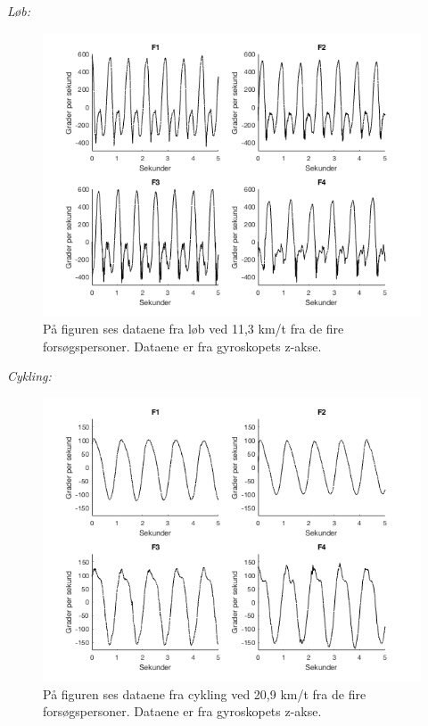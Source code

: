 \textit{Løb:}
\begin{figure}[H]
	\centering
	\includegraphics[scale=0.5]{figures/qBilag/loeb_gyro}
	\caption{På figuren ses dataene fra løb ved 11,3 km/t fra de fire forsøgspersoner. Dataene er fra gyroskopets z-akse.}
	\label{fig:Ap_cykling}
\end{figure}

\textit{Cykling:}
\begin{figure}[H]
	\centering
	\includegraphics[scale=0.5]{figures/qBilag/cykling_gyro}
	\caption{På figuren ses dataene fra cykling ved 20,9 km/t fra de fire forsøgspersoner. Dataene er fra gyroskopets z-akse.}
	\label{fig:Ap_cykling}
\end{figure}


